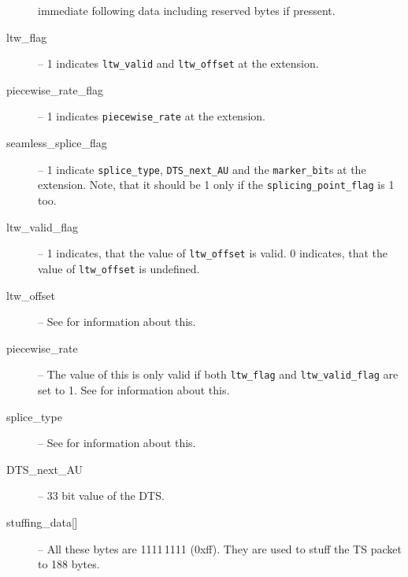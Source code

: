 \documentclass{scrartcl}
\begin{document}
\begin{description}
  immediate following data including reserved bytes if pressent.
\item[ltw\_flag] -- 1 indicates \texttt{ltw\_valid} and \texttt{ltw\_offset} at
  the extension.
\item[piecewise\_rate\_flag] -- 1 indicates \texttt{piecewise\_rate} at the
  extension.
\item[seamless\_splice\_flag] -- 1 indicate \texttt{splice\_type},
  \texttt{DTS\_next\_AU} and the \texttt{marker\_bit}s at the extension. Note,
  that it should be 1 only if the \texttt{splicing\_point\_flag} is 1 too.
\item[ltw\_valid\_flag] -- 1 indicates, that the value of \texttt{ltw\_offset}
  is valid. 0 indicates, that the value of \texttt{ltw\_offset} is undefined.
\item[ltw\_offset] -- See
  \cite[section~2.4.3.5]{iso13818-1} for information about this.
\item[piecewise\_rate] -- The value of this is only valid if both
  \texttt{ltw\_flag} and \texttt{ltw\_valid\_flag} are set to 1. See
  \cite[section~2.4.3.5]{iso13818-1} for information about this.
\item[splice\_type] -- See
  \cite[section~2.4.3.5]{iso13818-1} for information about this.
\item[DTS\_next\_AU]  -- 33 bit value of the DTS. 
\item[{stuffing\_data[]}] -- All these bytes are 1111\,1111 (0xff). They are
  used to stuff the TS packet to 188 bytes.
\end{description}
\end{document}
